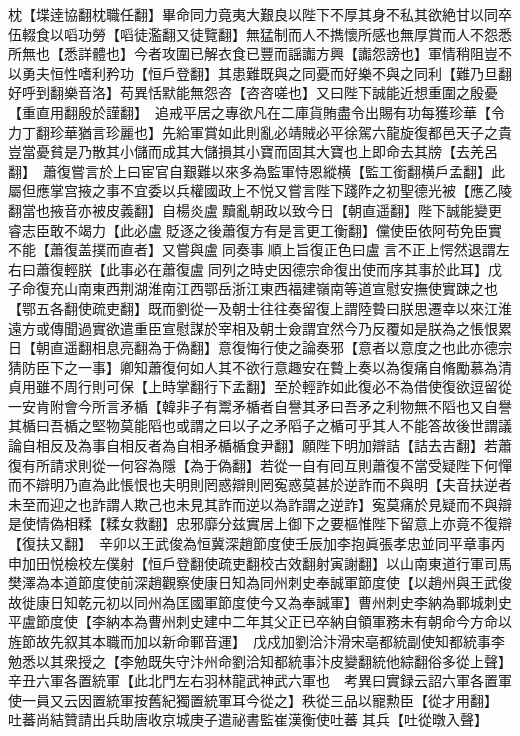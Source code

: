 枕【堞逹協翻枕職任翻】畢命同力竟夷大艱良以陛下不厚其身不私其欲絶甘以同卒伍輟食以㗖功勞【㗖徒濫翻又徒覽翻】無猛制而人不擕懷所感也無厚賞而人不怨悉所無也【悉詳體也】今者攻圍已解衣食已豐而謡讟方興【讟怨謗也】軍情稍阻豈不以勇夫恒性嗜利矜功【恒戶登翻】其患難既與之同憂而好樂不與之同利【難乃旦翻好呼到翻樂音洛】苟異恬默能無怨咨【咨咨嗟也】又曰陛下誠能近想重圍之殷憂【重直用翻殷於謹翻】　追戒平居之專欲凡在二庫貨賄盡令出賜有功每獲珍華【令力丁翻珍華猶言珍麗也】先給軍賞如此則亂必靖賊必平徐駕六龍旋復都邑天子之貴豈當憂貧是乃散其小儲而成其大儲損其小寶而固其大寶也上即命去其牓【去羌呂翻】　蕭復嘗言於上曰宦官自艱難以來多為監軍恃恩縱横【監工銜翻横戶孟翻】此屬但應掌宫掖之事不宜委以兵權國政上不悦又嘗言陛下踐阼之初聖德光被【應乙陵翻當也掖音亦被皮義翻】自楊炎盧黷亂朝政以致今日【朝直遥翻】陛下誠能變更睿志臣敢不竭力【此必盧貶逐之後蕭復方有是言更工衡翻】儻使臣依阿苟免臣實不能【蕭復盖撲而直者】又嘗與盧同奏事順上旨復正色曰盧言不正上愕然退謂左右曰蕭復輕朕【此事必在蕭復盧同列之時史因德宗命復出使而序其事於此耳】戊子命復充山南東西荆湖淮南江西鄂岳浙江東西福建嶺南等道宣慰安撫使實踈之也【鄂五各翻使疏吏翻】既而劉從一及朝士往往奏留復上謂陸䞇曰朕思遷幸以來江淮遠方或傳聞過實欲遣重臣宣慰謀於宰相及朝士僉謂宜然今乃反覆如是朕為之悵恨累日【朝直遥翻相息亮翻為于偽翻】意復悔行使之論奏邪【意者以意度之也此亦德宗猜防臣下之一事】卿知蕭復何如人其不欲行意趣安在䞇上奏以為復痛自脩勵慕為清貞用雖不周行則可保【上時掌翻行下孟翻】至於輕詐如此復必不為借使復欲逗留從一安肯附會今所言矛楯【韓非子有鬻矛楯者自譽其矛曰吾矛之利物無不䧟也又自譽其楯曰吾楯之堅物莫能䧟也或謂之曰以子之矛䧟子之楯可乎其人不能答故後世謂議論自相反及為事自相反者為自相矛楯楯食尹翻】願陛下明加辯詰【詰去吉翻】若蕭復有所請求則從一何容為隱【為于偽翻】若從一自有囘互則蕭復不當受疑陛下何憚而不辯明乃直為此悵恨也夫明則罔惑辯則罔寃惑莫甚於逆詐而不與明【夫音扶逆者未至而迎之也詐謂人欺己也未見其詐而逆以為詐謂之逆詐】寃莫痛於見疑而不與辯是使情偽相糅【糅女救翻】忠邪靡分兹實居上御下之要樞惟陛下留意上亦竟不復辯【復扶又翻】　辛卯以王武俊為恒冀深趙節度使壬辰加李抱眞張孝忠並同平章事丙申加田悦檢校左僕射【恒戶登翻使疏吏翻校古效翻射寅謝翻】以山南東道行軍司馬樊澤為本道節度使前深趙觀察使康日知為同州刺史奉誠軍節度使【以趙州與王武俊故徙康日知乾元初以同州為匡國軍節度使今又為奉誠軍】曹州刺史李納為鄆城刺史平盧節度使【李納本為曹州刺史建中二年其父正已卒納自領軍務未有朝命今方命以旌節故先叙其本職而加以新命鄆音運】　戊戍加劉洽汴滑宋亳都統副使知都統事李勉悉以其衆授之【李勉既失守汴州命劉洽知都統事汴皮變翻統他綜翻俗多從上聲】　辛丑六軍各置統軍【此北門左右羽林龍武神武六軍也　考異曰實録云詔六軍各置軍使一員又云因置統軍按舊紀獨置統軍耳今從之】秩從三品以寵勲臣【從才用翻】　吐蕃尚結贊請出兵助唐收京城庚子遣祕書監崔漢衡使吐蕃其兵【吐從暾入聲】

